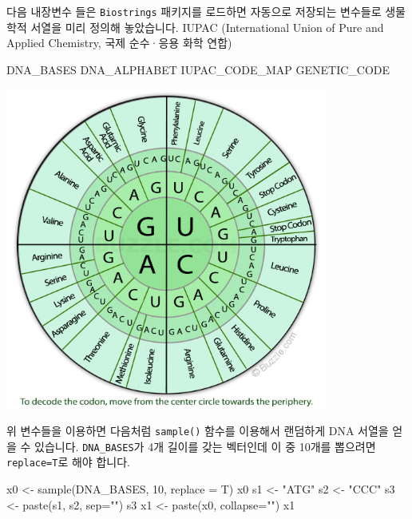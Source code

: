 \documentclass[
  a4paper,
]{book}
\newenvironment{Shaded}{\begin{snugshade}}{\end{snugshade}}
\newcommand{\AttributeTok}[1]{\textcolor[rgb]{0.40,0.45,0.13}{#1}}
\newcommand{\DecValTok}[1]{\textcolor[rgb]{0.68,0.00,0.00}{#1}}
\newcommand{\FunctionTok}[1]{\textcolor[rgb]{0.28,0.35,0.67}{#1}}
\newcommand{\NormalTok}[1]{\textcolor[rgb]{0.00,0.23,0.31}{#1}}
\newcommand{\OtherTok}[1]{\textcolor[rgb]{0.00,0.23,0.31}{#1}}
\newcommand{\StringTok}[1]{\textcolor[rgb]{0.13,0.47,0.30}{#1}}
\begin{document}
다음 내장변수 들은 \texttt{Biostrings} 패키지를 로드하면 자동으로
저장되는 변수들로 생물학적 서열을 미리 정의해 놓았습니다. IUPAC
(International Union of Pure and Applied Chemistry, 국제 순수·응용 화학
연합)

\begin{Shaded}
\begin{Highlighting}[]
\NormalTok{DNA\_BASES}
\NormalTok{DNA\_ALPHABET}
\NormalTok{IUPAC\_CODE\_MAP}
\NormalTok{GENETIC\_CODE}
\end{Highlighting}
\end{Shaded}

\includegraphics[width=4.16667in,height=\textheight]{images/rna-codon-chart.jpg}

위 변수들을 이용하면 다음처럼 \texttt{sample()} 함수를 이용해서 랜덤하게
DNA 서열을 얻을 수 있습니다. \texttt{DNA\_BASES}가 4개 길이를 갖는
벡터인데 이 중 10개를 뽑으려면 \texttt{replace=T}로 해야 합니다.

\begin{Shaded}
\begin{Highlighting}[]
\NormalTok{x0 }\OtherTok{\textless{}{-}} \FunctionTok{sample}\NormalTok{(DNA\_BASES, }\DecValTok{10}\NormalTok{, }\AttributeTok{replace =}\NormalTok{ T)}
\NormalTok{x0}
\NormalTok{s1 }\OtherTok{\textless{}{-}} \StringTok{"ATG"}
\NormalTok{s2 }\OtherTok{\textless{}{-}} \StringTok{"CCC"}
\NormalTok{s3 }\OtherTok{\textless{}{-}} \FunctionTok{paste}\NormalTok{(s1, s2, }\AttributeTok{sep=}\StringTok{""}\NormalTok{)}
\NormalTok{s3}
\NormalTok{x1 }\OtherTok{\textless{}{-}} \FunctionTok{paste}\NormalTok{(x0, }\AttributeTok{collapse=}\StringTok{""}\NormalTok{)}
\NormalTok{x1}
\end{Highlighting}
\end{Shaded}
\end{document}
